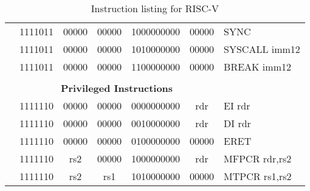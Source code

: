 \begin{table}[p]
\begin{small}
\begin{center}
\begin{tabular}{rcccccccccccl}
&
\multicolumn{2}{|c|}{1111011} &
\multicolumn{1}{c|}{00000} &
\multicolumn{1}{c|}{00000} &
\multicolumn{6}{c|}{1000000000} &
\multicolumn{1}{c|}{00000} & SYNC  \\
\cline{2-12}
  

&
\multicolumn{2}{|c|}{1111011} &
\multicolumn{1}{c|}{00000} &
\multicolumn{1}{c|}{00000} &
\multicolumn{6}{c|}{1010000000} &
\multicolumn{1}{c|}{00000} & SYSCALL imm12 \\
\cline{2-12}
  

&
\multicolumn{2}{|c|}{1111011} &
\multicolumn{1}{c|}{00000} &
\multicolumn{1}{c|}{00000} &
\multicolumn{6}{c|}{1100000000} &
\multicolumn{1}{c|}{00000} & BREAK imm12 \\
\cline{2-12}
  

&
\multicolumn{11}{c}{} & \\
&
\multicolumn{11}{c}{\bf Privileged Instructions} & \\
\cline{2-12}
  

&
\multicolumn{2}{|c|}{1111110} &
\multicolumn{1}{c|}{00000} &
\multicolumn{1}{c|}{00000} &
\multicolumn{6}{c|}{0000000000} &
\multicolumn{1}{c|}{rdr} & EI rdr \\
\cline{2-12}
  

&
\multicolumn{2}{|c|}{1111110} &
\multicolumn{1}{c|}{00000} &
\multicolumn{1}{c|}{00000} &
\multicolumn{6}{c|}{0010000000} &
\multicolumn{1}{c|}{rdr} & DI rdr \\
\cline{2-12}
  

&
\multicolumn{2}{|c|}{1111110} &
\multicolumn{1}{c|}{00000} &
\multicolumn{1}{c|}{00000} &
\multicolumn{6}{c|}{0100000000} &
\multicolumn{1}{c|}{00000} & ERET  \\
\cline{2-12}
  

&
\multicolumn{2}{|c|}{1111110} &
\multicolumn{1}{c|}{rs2} &
\multicolumn{1}{c|}{00000} &
\multicolumn{6}{c|}{1000000000} &
\multicolumn{1}{c|}{rdr} & MFPCR rdr,rs2 \\
\cline{2-12}
  

&
\multicolumn{2}{|c|}{1111110} &
\multicolumn{1}{c|}{rs2} &
\multicolumn{1}{c|}{rs1} &
\multicolumn{6}{c|}{1010000000} &
\multicolumn{1}{c|}{00000} & MTPCR rs1,rs2 \\
\cline{2-12}
  

\end{tabular}
\end{center}
\end{small}
\caption{Instruction listing for RISC-V}
\label{instr-table}
\end{table}
  

